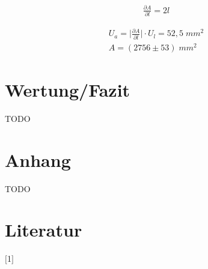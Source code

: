 \documentclass[a4paper]{scrartcl}
\numberwithin{equation}{subsection}
\begin{document}
\begin{align}
\frac{\partial A}{\partial l} = 2l
\end{align}

\begin{align*}
U_a = \bigg | \frac{\partial A}{\partial l} \bigg | \cdot U_l = 52,5\;mm^2 \\
A = (2756\pm 53)\;mm^2
\end{align*}

\newpage
\section{Wertung/Fazit}
TODO

\newpage
\section{Anhang}
TODO

\newpage
\section{Literatur}
$[$1$]$ 


\label{LastPage}
\end{document}
